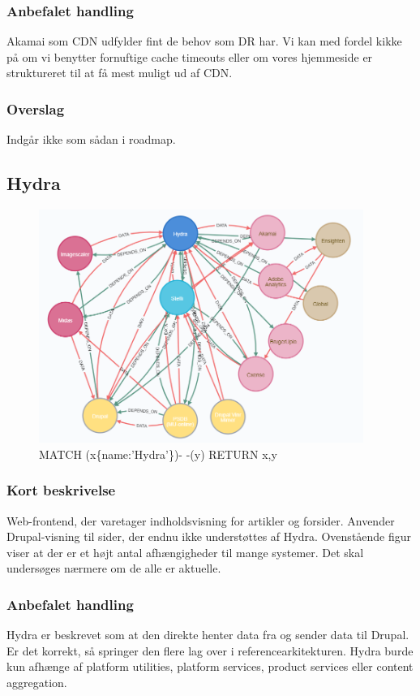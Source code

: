 \documentclass{article}
\begin{document}
\subsubsection{Anbefalet handling}
Akamai som CDN udfylder fint de behov som DR har. 
Vi kan med fordel kikke på om vi benytter fornuftige cache timeouts eller om vores hjemmeside er struktureret til at få mest muligt ud af CDN.

\subsubsection{Overslag}
Indgår ikke som sådan i roadmap.


\subsection{Hydra}
\begin{figure}[h]
\includegraphics[width=300pt]{Hydra.PNG}
\caption{MATCH (x\{name:'Hydra'\})- -(y) RETURN x,y}
\end{figure}
\subsubsection{Kort beskrivelse}
Web-frontend, der varetager indholdsvisning for artikler og forsider. Anvender Drupal-visning til sider, der endnu ikke understøttes af Hydra.
Ovenstående figur viser at der er et højt antal afhængigheder til mange systemer. Det skal undersøges nærmere om de alle er aktuelle.
\subsubsection{Anbefalet handling}
Hydra er beskrevet som at den direkte henter data fra og sender data til Drupal. Er det korrekt, så springer den flere lag over i referencearkitekturen.
Hydra burde kun afhænge af platform utilities, platform services, product services eller content aggregation.
\end{document}
